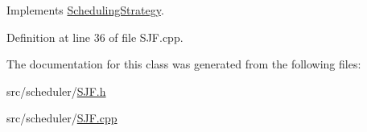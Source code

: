 Implements \hyperlink{class_scheduling_strategy_a62ffa0426528c14fdd0b0853f04a851f}{Scheduling\+Strategy}.



Definition at line 36 of file S\+J\+F.\+cpp.



The documentation for this class was generated from the following files\+:\begin{DoxyCompactItemize}
\item 
src/scheduler/\hyperlink{_s_j_f_8h}{S\+J\+F.\+h}\item 
src/scheduler/\hyperlink{_s_j_f_8cpp}{S\+J\+F.\+cpp}\end{DoxyCompactItemize}
